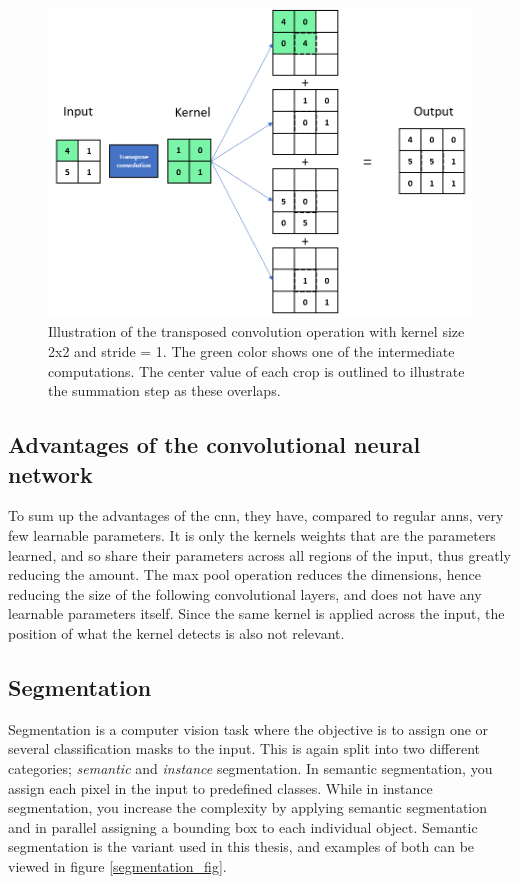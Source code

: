     \begin{figure}[H]
        \centering
        \includegraphics[scale=0.5]{figures/transpose_convolution.png}
        \caption[Transposed convolution]{Illustration of the transposed convolution operation with kernel size 2x2 and stride = 1. The green color shows one of the intermediate computations. The center value of each crop is outlined to illustrate the summation step as these overlaps.}
      	\medskip 
        \label{transposed_conv_fig}
    \end{figure}
    
\subsection{Advantages of the convolutional neural network}
    To sum up the advantages of the \gls{cnn}\cite{o2015introduction_convolutions}, they have, compared to regular \gls{ann}s, very few learnable parameters. It is only the kernels weights that are the parameters learned, and so share their parameters across all regions of the input, thus greatly reducing the amount. The max pool operation reduces the dimensions, hence reducing the size of the following convolutional layers, and does not have any learnable parameters itself. Since the same kernel is applied across the input, the position of what the kernel detects is also not relevant.
    
    
\subsection{Segmentation}
    Segmentation is a computer vision task where the objective is to assign one or several classification masks to the input\cite{He_2017_ICCV_segmentation}. This is again split into two different categories; \textit{semantic} and \textit{instance} segmentation. In semantic segmentation, you assign each pixel in the input to predefined classes. While in instance segmentation, you increase the complexity by applying semantic segmentation and in parallel assigning a bounding box to each individual object. Semantic segmentation is the variant used in this thesis, and examples of both can be viewed in figure \ref{segmentation_fig}.
    

